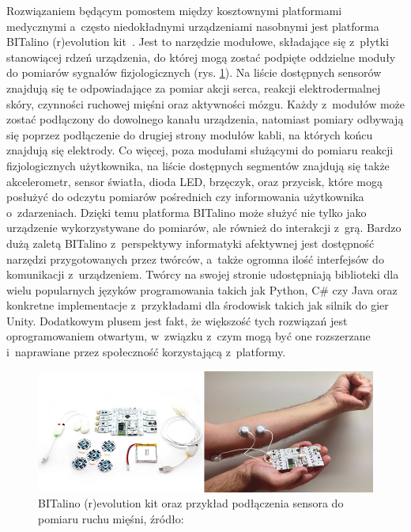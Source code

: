 Rozwiązaniem będącym pomostem między kosztownymi platformami medycznymi a~często niedokładnymi urządzeniami nasobnymi jest platforma BITalino (r)evolution kit~\cite{bitalino_documentation}. Jest to narzędzie modułowe, składające się z~płytki stanowiącej rdzeń urządzenia, do której mogą zostać podpięte oddzielne moduły do pomiarów sygnałów fizjologicznych (rys. \ref{fig:bitalino}). Na liście dostępnych sensorów znajdują się te odpowiadające za pomiar akcji serca, reakcji elektrodermalnej skóry, czynności ruchowej mięśni oraz aktywności mózgu. Każdy z~modułów może zostać podłączony do dowolnego kanału urządzenia, natomiast pomiary odbywają się poprzez podłączenie do drugiej strony modułów kabli, na których końcu znajdują się elektrody. Co więcej, poza modułami służącymi do pomiaru reakcji fizjologicznych użytkownika, na liście dostępnych segmentów znajdują się także akcelerometr, sensor światła, dioda LED, brzęczyk, oraz przycisk, które mogą posłużyć do odczytu pomiarów pośrednich czy informowania użytkownika o~zdarzeniach. Dzięki temu platforma BITalino może służyć nie tylko jako urządzenie wykorzystywane do pomiarów, ale również do interakcji z~grą. Bardzo dużą zaletą BITalino z~perspektywy informatyki afektywnej jest dostępność narzędzi przygotowanych przez twórców, a~także ogromna ilość interfejsów do komunikacji z~urządzeniem. Twórcy na swojej stronie udostępniają biblioteki dla wielu popularnych języków programowania takich jak Python, C\# czy Java oraz konkretne implementacje z~przykładami dla środowisk takich jak silnik do gier Unity. Dodatkowym plusem jest fakt, że większość tych rozwiązań jest oprogramowaniem otwartym, w~związku z~czym mogą być one rozszerzane i~naprawiane przez społeczność korzystającą z~platformy.

\begin{figure}
	\centering
	\includegraphics[width=0.9\linewidth]{images/bitalino_emg.png}
	\caption{BITalino (r)evolution kit oraz przykład podłączenia sensora do pomiaru ruchu mięśni, źródło: \cite{neurobit_manual}}
	\label{fig:bitalino}
\end{figure}

